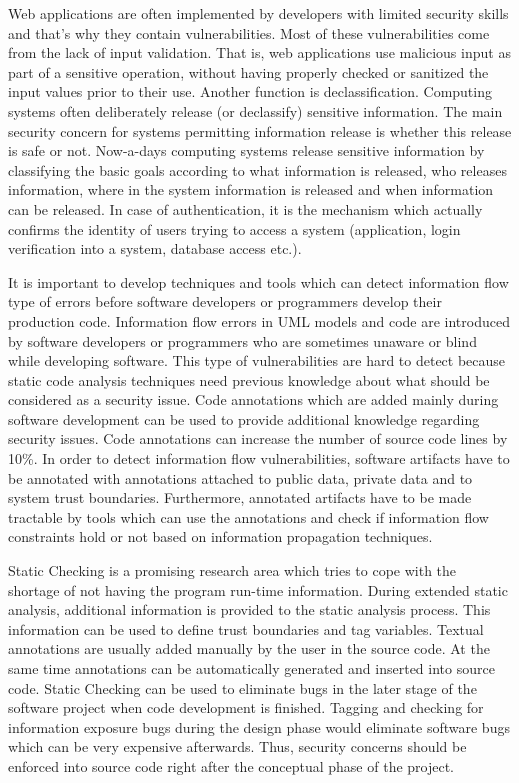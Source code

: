 Web applications are often implemented by developers with limited security skills and that's why they contain vulnerabilities. Most of these vulnerabilities come from the lack of input validation. That is, web applications use malicious input as part of a sensitive operation, without having properly checked or sanitized the input values
prior to their use. Another function is declassification. Computing systems often deliberately release (or declassify) sensitive information. The main security concern for systems permitting information release is whether this release is safe or not. Now-a-days computing systems release sensitive information by classifying the basic goals according to what information is released, who releases information, where in the system information is released and when information can be released. In case of authentication, it is the mechanism which actually confirms the identity of users trying to access a system (application, login verification into a system, database access etc.). 

It is important to develop techniques and tools which can detect information flow type of errors before software developers or programmers develop their production code. Information flow errors in UML models and code are introduced by software developers or programmers who are sometimes unaware or blind while developing software. This type of vulnerabilities are hard to detect because static code analysis techniques need previous knowledge about what should be considered as a security issue. Code annotations which are added mainly during software development \cite{ref_18_chess2004static} can be used to provide additional knowledge regarding security issues. Code annotations can increase the number of source code lines by 10\%. In order to detect information flow vulnerabilities, software artifacts have to be annotated with annotations attached to public data, private data and to system trust boundaries. Furthermore, annotated artifacts have to be made tractable by tools which can use the annotations and check if information flow constraints hold or not based on information propagation techniques.

Static Checking is a promising research area which tries to cope with the shortage of not having the program run-time information. During extended static analysis, additional information is provided to the static analysis process. This information can be used to define trust boundaries and tag variables. Textual annotations are usually added manually by the user in the source code. At the same time annotations can be automatically generated and inserted into source code. Static Checking can be used to eliminate bugs in the later stage of the software project when code development is finished. Tagging and checking for information exposure bugs during the design phase would eliminate software bugs which can be very expensive afterwards. Thus, security concerns should be enforced into source code right after the conceptual phase of the project.

